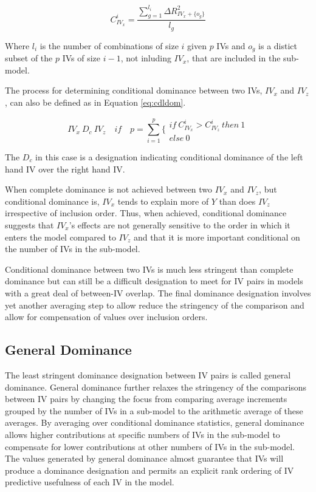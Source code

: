 \documentclass[ShortAfour,times,sageapa]{sagej}
\begin{document}
	\begin{equation}
		C^{i}_{IV_x} = \frac{\sum^{l_i}_{g=1} \Delta R^2_{IV_x + \{o_g\}}}{l_g}
		\label{eq:cdlst}
	\end{equation}
	
	Where $l_i$ is the number of combinations of size $i$ given $p$ IVs and $o_g$ is a distict subset of the $p$ IVs of size $i - 1$, not inluding $IV_x$, that are included in the sub-model.
	
	The process for determining conditional dominance between two IVs, $IV_x$ and $IV_z$, can also be defined as in Equation \ref{eq:cdldom}.
	
	\begin{equation}
		IV_x \ D_c \ IV_z \quad if \quad p = \sum^p_{i=1} \Biggl\{ \begin{matrix} if \ C^{i}_{IV_x} > C^{i}_{IV_z} \ then \ 1 \\ else \ 0 \end{matrix}
		\label{eq:cdldom}
	\end{equation}
	
	The $D_c$ in this case is a designation indicating conditional dominance of the left hand IV over the right hand IV.
	
	When complete dominance is not achieved between two $IV_x$ and $IV_z$, but conditional dominance is, $IV_x$ tends to explain more of $Y$ than does $IV_z$ irrespective of inclusion order.
	Thus, when achieved, conditional dominance suggests that $IV_x$'s effects are not generally sensitive to the order in which it enters the model compared to $IV_z$ and that it is more important conditional on the number of IVs in the sub-model.
	
	Conditional dominance between two IVs is much less stringent than complete dominance but can still be a difficult designation to meet for IV pairs in models with a great deal of between-IV overlap.
	The final dominance designation involves yet another averaging step to allow reduce the stringency of the comparison and allow for compensation of values over inclusion orders.
	
	\subsection{General Dominance}
	
	The least stringent dominance designation between IV pairs is called general dominance.
	General dominance further relaxes the stringency of the comparisons between IV pairs by changing the focus from comparing average increments grouped by the number of IVs in a sub-model to the arithmetic average of these averages.
	By averaging over conditional dominance statistics, general dominance allows higher contributions at specific numbers of IVs in the sub-model to compensate for lower contributions at other numbers of IVs in the sub-model. 
	The values generated by general dominance almost guarantee that IVs will produce a dominance designation and permits an explicit rank ordering of IV predictive usefulness of each IV in the model.
	
\end{document}
